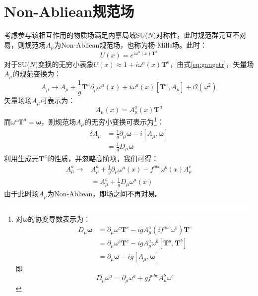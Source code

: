 \section{Non-Abliean规范场}
考虑参与该相互作用的物质场满足内禀局域SU($N$)对称性，此时规范群元互不对易，则规范场$A_\mu$为Non-Abliean规范场，也称为杨-Mills场。此时：
\begin{equation}
	U(x)=e^{i\omega^a(x)\boldsymbol{T}^a}
\end{equation}
对于SU($N$)变换的无穷小表象$U(x)\approx1+i\omega^a(x)\boldsymbol{T}^a$，由式\eqref{eq:gaugetr}，矢量场$A_\mu$的规范变换为：
\begin{equation}
	A_\mu\rightarrow A_\mu+\frac{1}{g}\boldsymbol{T}^a\partial_\mu \omega^a(x)+i\omega^a(x)[\boldsymbol{T}^a,A_\mu]+\mathcal{O}(\omega^2)
\end{equation}
矢量场场$A_\mu$可表示为：
\begin{equation}
A_\mu(x)=A^a_\mu(x)\boldsymbol{T}^a
\end{equation}
而$\omega^a\boldsymbol{T}^a=\boldsymbol{\omega}$，则规范场$A_\mu$的无穷小变换可表示为\footnote{对$\boldsymbol{\omega}$的协变导数表示为：\[\begin{split}
	D_\mu\boldsymbol{\omega}&=\partial_\mu\omega^c\boldsymbol{T}^c-igA_\mu^a(if^{abc}\omega^b)\boldsymbol{T}^c\\&=\partial_\mu\omega^c\boldsymbol{T}^c-igA_\mu^a\omega^b[\boldsymbol{T}^a,\boldsymbol{T}^b]\\&=\partial_\mu\boldsymbol{\omega}-ig[A_\mu,\boldsymbol{\omega}]
	\end{split}\]即\[D_\mu\omega^a=\partial_\mu\omega^a+gf^{abc} A_\mu^b\omega^c\]}：
\begin{equation}
\begin{split}
\delta A_\mu&=\frac{1}{g}\partial_\mu\boldsymbol{\omega}-i[A_\mu,\boldsymbol{\omega}]\\
&=\frac{1}{g}D_\mu\boldsymbol{\omega}
\end{split}
\end{equation}
利用生成元$\boldsymbol{T}^a$的性质，并忽略高阶项，我们可得：
\begin{equation}
\begin{split}
	A^a_\mu\rightarrow& A^a_\mu+\frac{1}{g}\partial_\mu \omega^a(x)-f^{abc}\omega^b(x)A^c_\mu\\&=A^a_\mu+\frac{1}{g}D_\mu\omega^a(x)
\end{split}
\end{equation}
由于此时场$A_\mu$为Non-Abliean，即场之间不再对易。

